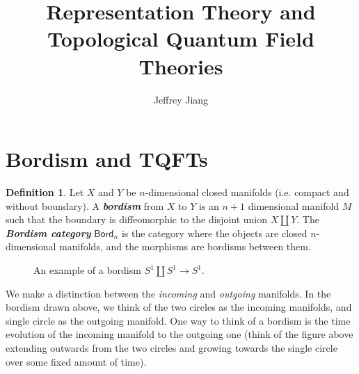 \documentclass[psamsfonts, 11pt]{amsart}
\newcommand{\incfig}[2]{%
    \def\svgwidth{\columnwidth}
    \scalebox{#2}{}
}
\theoremstyle{definition}
\newtheorem{defn}[thm]{Definition}
\theoremstyle{remark}
\newcommand{\Bord}{\mathsf{Bord}}
\newcommand{\ib}[1]{\textbf{\textit{#1}}}
\begin{document}
%
\author{Jeffrey Jiang}
%
\title{Representation Theory and Topological Quantum Field Theories}
%
\maketitle
%
\section{Bordism and TQFTs}
%
\begin{defn}
Let $X$ and $Y$ be $n$-dimensional closed manifolds (i.e. compact and without boundary).
A \ib{bordism} from $X$ to $Y$ is an $n+1$ dimensional manifold $M$ such that
the boundary is diffeomorphic to the disjoint union $X \coprod Y$. The
\ib{Bordism category} $\Bord_n$ is the category where the objects are closed
$n$-dimensional manifolds, and the morphisms are bordisms between them.
\end{defn}
%
\begin{figure}[ht]
  \centering
  \incfig{bordism}{0.20}
  \caption{An example of a bordism $S^1 \coprod S^1 \to S^1$.}
\end{figure}
%
We make a distinction between the \emph{incoming} and \emph{outgoing} manifolds.
In the bordism drawn above, we think of the two circles as the incoming manifolds,
and single circle as the outgoing manifold. One way to think of a bordism is
the time evolution of the incoming manifold to the outgoing one (think of the
figure above extending outwards from the two circles and growing towards the
single circle over some fixed amount of time). \\
\end{document}
